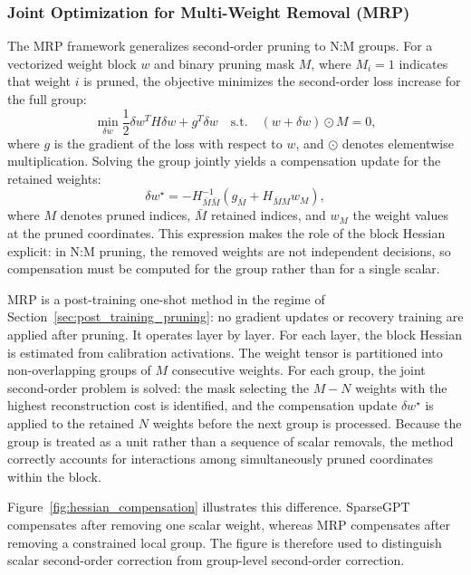 \methodsep

\subsubsection{Joint Optimization for Multi-Weight Removal (MRP)}

The MRP framework \cite{zhao2024pruning} generalizes second-order pruning to N:M groups. For a vectorized weight block $w$ and binary pruning mask $M$, where $M_i=1$ indicates that weight $i$ is pruned, the objective minimizes the second-order loss increase for the full group:
\begin{equation}\label{eq:ptp}
	\min_{\delta w} \frac{1}{2}\delta w^T H \delta w + g^T \delta w
	\quad\text{s.t.}\quad
	(w+\delta w)\odot M = 0,
\end{equation}
where $g$ is the gradient of the loss with respect to $w$, and $\odot$ denotes elementwise multiplication. Solving the group jointly yields a compensation update for the retained weights:
\begin{equation}
	\delta w^\star = -H_{\bar{M}\bar{M}}^{-1}(g_{\bar{M}} + H_{\bar{M}M}w_M),
\end{equation}
where $M$ denotes pruned indices, $\bar{M}$ retained indices, and $w_M$ the weight values at the pruned coordinates. This expression makes the role of the block Hessian explicit: in N:M pruning, the removed weights are not independent decisions, so compensation must be computed for the group rather than for a single scalar.

MRP is a post-training one-shot method in the regime of Section~\ref{sec:post_training_pruning}: no gradient updates or recovery training are applied after pruning. It operates layer by layer. For each layer, the block Hessian is estimated from calibration activations. The weight tensor is partitioned into non-overlapping groups of $M$ consecutive weights. For each group, the joint second-order problem is solved: the mask selecting the $M-N$ weights with the highest reconstruction cost is identified, and the compensation update $\delta w^\star$ is applied to the retained $N$ weights before the next group is processed. Because the group is treated as a unit rather than a sequence of scalar removals, the method correctly accounts for interactions among simultaneously pruned coordinates within the block.

Figure~\ref{fig:hessian_compensation} illustrates this difference. SparseGPT compensates after removing one scalar weight, whereas MRP compensates after removing a constrained local group. The figure is therefore used to distinguish scalar second-order correction from group-level second-order correction.

